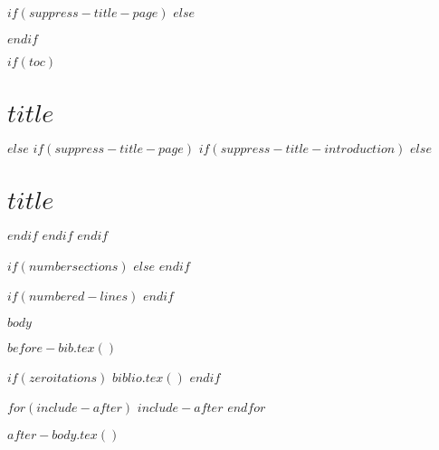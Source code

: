 $if(suppress-title-page)$
$else$
\maketitle
$endif$

$if(toc)$
\hypertarget{toc}{}
\tableofcontents
\newpage
\section[Introduction]{$title$}
$else$
$if(suppress-title-page)$
$if(suppress-title-introduction)$
$else$
\section[Introduction]{$title$}
$endif$
$endif$
$endif$

$if(numbersections)$
\setcounter{secnumdepth}{$if(secnumdepth)$$secnumdepth$$else$5$endif$}
$else$
\setcounter{secnumdepth}{-\maxdimen} %
$endif$

\setlength\LTleft{0pt}

$if(numbered-lines)$
\resetlinenumber[1]
$endif$

$body$

$before-bib.tex()$

$if(zeroitations)$
$biblio.tex()$
$endif$

$for(include-after)$
$include-after$
$endfor$

$after-body.tex()$


